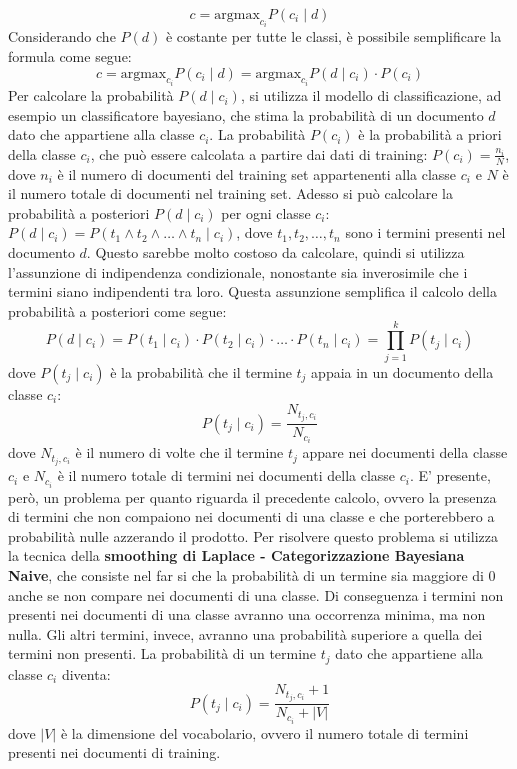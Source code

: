 \documentclass{report}
\begin{document}
	\[
	c = \text{argmax}_{c_i} P(c_i \mid d)
	\]
	Considerando che $P(d)$ è costante per tutte le classi, è possibile semplificare la formula come segue:
	\[
	c = \text{argmax}_{c_i} P(c_i \mid d) = \text{argmax}_{c_i} P(d \mid c_i) \cdot P(c_i)
	\]
	Per calcolare la probabilità $P(d \mid c_i)$, si utilizza il modello di classificazione, ad esempio un classificatore bayesiano, che stima la probabilità di un documento $d$ dato che appartiene alla classe $c_i$. La probabilità $P(c_i)$ è la probabilità a priori della classe $c_i$, che può essere calcolata a partire dai dati di training: $P(c_i) = \frac{n_i}{N}$, dove $n_i$ è il numero di documenti del training set appartenenti alla classe $c_i$ e $N$ è il numero totale di documenti nel training set.
	Adesso si può calcolare la probabilità a posteriori $P(d \mid c_i)$ per ogni classe $c_i$: $P(d \mid c_i) = P(t_1 \land t_2 \land \ldots \land t_n \mid c_i)$, dove $t_1, t_2, \ldots, t_n$ sono i termini presenti nel documento $d$. Questo sarebbe molto costoso da calcolare, quindi si utilizza l'assunzione di indipendenza condizionale, nonostante sia inverosimile che i termini siano indipendenti tra loro. Questa assunzione semplifica il calcolo della probabilità a posteriori come segue:
	\[
	P(d \mid c_i) = P(t_1 \mid c_i) \cdot P(t_2 \mid c_i) \cdot \ldots \cdot P(t_n \mid c_i) = \prod_{j=1}^{k} P(t_j \mid c_i)
	\] 
	dove  $P(t_j \mid c_i)$ è la probabilità che il termine $t_j$ appaia in un documento della classe $c_i$:
	\[
	P(t_j \mid c_i) = \frac{N_{t_j, c_i}}{N_{c_i}}
	\]
	dove $N_{t_j, c_i}$ è il numero di volte che il termine $t_j$ appare nei documenti della classe $c_i$ e $N_{c_i}$ è il numero totale di termini nei documenti della classe $c_i$. E' presente, però, un problema per quanto riguarda il precedente calcolo, ovvero la presenza di termini che non compaiono nei documenti di una classe e che porterebbero a probabilità nulle azzerando il prodotto. Per risolvere questo problema si utilizza la tecnica della \textbf{smoothing di Laplace - Categorizzazione Bayesiana Naive}, che consiste nel far si che la probabilità di un termine sia maggiore di 0 anche se non compare nei documenti di una classe. Di conseguenza i termini non presenti nei documenti di una classe avranno una occorrenza minima, ma non nulla. Gli altri termini, invece, avranno una probabilità superiore a quella dei termini non presenti. La probabilità di un termine $t_j$ dato che appartiene alla classe $c_i$ diventa:
	\[
	P(t_j \mid c_i) = \frac{N_{t_j, c_i} + 1}{N_{c_i} + |V|}
	\]
	dove $|V|$ è la dimensione del vocabolario, ovvero il numero totale di termini presenti nei documenti di training.
\end{document}

